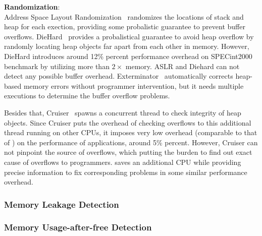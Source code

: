 \textbf{Randomization}: \\
Address Space Layout Randomization~\cite{addressobfuscation, Pax} randomizes the locations of stack and heap for each exection, providing some probalistic guarantee to prevent buffer overflows.  
DieHard~\cite{diehard} provides a probalistical guarantee to avoid heap overflow by randomly locating 
heap objects far apart from each other in memory. However, DieHard introduces around 12\% percent performance overhead on SPECint2000 benchmark by utilizing more than 
$2\times$ memory. 
ASLR and Diehard can not detect any possible buffer overhead. 
Exterminator~\cite{exterminator} automatically corrects heap-based memory errors without programmer 
intervention, but it needs multiple executions to determine the buffer overflow 
problems.

Besides that, Cruiser~\cite{overflow:Cruiser} spawns a concurrent thread to check integrity of heap objects.
Since Cruiser puts the overhead of checking overflows to this additional thread running on other CPUs,
it imposes very low overhead (comparable to that of \doubletake{}) on the performance of applications, 
around 5\% percent. However, Cruiser can not pinpoint the source of overflows, which putting the 
burden to find out exact cause of overflows to programmers. 
\doubletake{} saves an additional CPU while providing precise information to fix corresponding problems
in some similar performance overhead.   

\subsubsection{Memory Leakage Detection}

\subsubsection{Memory Usage-after-free Detection}

\begin{comment} 
A lot of  tools utilize the binary instrumentations, such as
Valgrind~\cite{overflow:valgrind}, Purify~\cite{overflow:purify}, 
Dr. Memory~\cite{overflow:drmemory}, 
Inspector~\cite{overflow:inspector} and Discover~\cite{overflow:discover}.


 Mudflap~\cite{overflow:Mudflap}
and AddressSanitizer~\cite{AddressSanitizer}.

However, AddressSanitizer can not detect the problems caused by library calls and partial 
out-of-bounds error caused by an unaligned access. 
The performance overhead of AddressSanitizer is still significant: average 26\% slowdown if writes are
instrumented only and 73\% slowdown if all acccesses are instrumented.
\end{comment}

